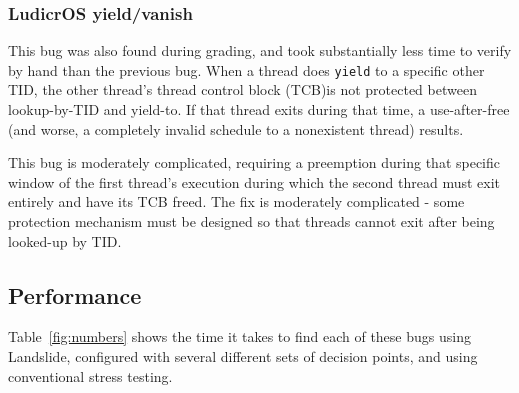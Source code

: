 \subsubsection{LudicrOS yield/vanish}

This bug was also found during grading, and took substantially less time to verify by hand than the previous bug. When a thread does \texttt{yield} to a specific other TID, the other thread's thread control block (TCB)is not protected between lookup-by-TID and yield-to. If that thread exits during that time, a use-after-free (and worse, a completely invalid schedule to a nonexistent thread) results.

This bug is moderately complicated, requiring a preemption during that specific window of the first thread's execution during which the second thread must exit entirely and have its TCB freed. The fix is moderately complicated - some protection mechanism must be designed so that threads cannot exit after being looked-up by TID.

\subsection{Performance}
\label{sec:eval-numbers}

Table~\ref{fig:numbers} shows the time it takes to find each of these bugs using Landslide, configured with several different sets of decision points, and using conventional stress testing.

\newcommand\bugnum[2]{\textcolor{BrickRed}{{\bf #1} {\scriptsize \em (#2)}}}
\newcommand\nobugnum[2]{\textcolor{Blue}{{\em #1} {\scriptsize \em (#2)}}}

